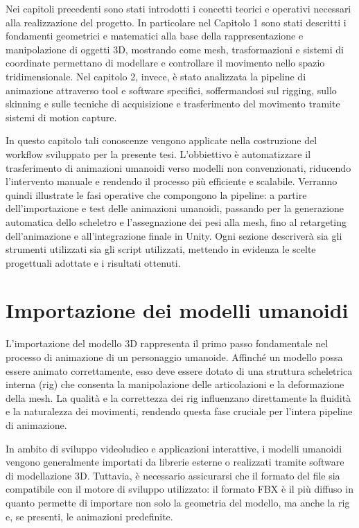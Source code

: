 Nei capitoli precedenti sono stati introdotti i concetti teorici e operativi necessari alla realizzazione del progetto. In particolare nel Capitolo 1 sono stati descritti i fondamenti geometrici e matematici alla base della rappresentazione e manipolazione di oggetti 3D, mostrando come mesh, trasformazioni e sistemi di coordinate permettano di modellare e controllare il movimento nello spazio tridimensionale. Nel capitolo 2, invece, è stato analizzata la pipeline di animazione attraverso tool e software specifici, soffermandosi sul rigging, sullo skinning e sulle tecniche di acquisizione e trasferimento del movimento tramite sistemi di motion capture.

In questo capitolo tali conoscenze vengono applicate nella costruzione del workflow sviluppato per la presente tesi. L'obbiettivo è automatizzare il trasferimento di animazioni umanoidi verso modelli non convenzionati, riducendo l'intervento manuale e rendendo il processo più efficiente e scalabile. Verranno quindi illustrate le fasi operative che compongono la pipeline: a partire dell'importazione e test delle animazioni umanoidi, passando per la generazione automatica dello scheletro e l'assegnazione dei pesi alla mesh, fino al retargeting dell'animazione e all'integrazione finale in Unity. Ogni sezione descriverà sia gli strumenti utilizzati sia gli script utilizzati, mettendo in evidenza le scelte progettuali adottate e i risultati ottenuti.

\section{Importazione dei modelli umanoidi}

L'importazione del modello 3D rappresenta il primo passo fondamentale nel processo di animazione di un personaggio umanoide. Affinché un modello possa essere animato correttamente, esso deve essere dotato di una struttura scheletrica interna (rig) che consenta la manipolazione delle articolazioni e la deformazione della mesh. La qualità e la correttezza dei rig influenzano direttamente la fluidità e la naturalezza dei movimenti, rendendo questa fase cruciale per l'intera pipeline di animazione.

In ambito di sviluppo videoludico e applicazioni interattive, i modelli umanoidi vengono generalmente importati da librerie esterne o realizzati tramite software di modellazione 3D. Tuttavia, è necessario assicurarsi che il formato del file sia compatibile con il motore di sviluppo utilizzato: il formato FBX è il più diffuso in quanto permette di importare non solo la geometria del modello, ma anche la rig e, se presenti, le animazioni predefinite.


